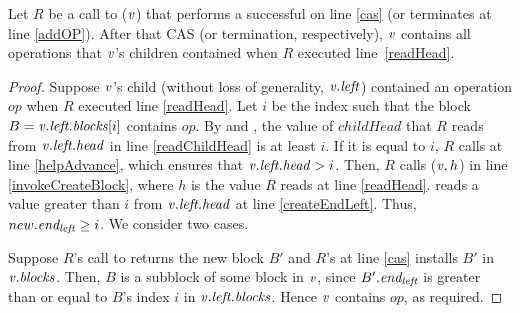\begin{lemma}\label{successfulRefresh}
Let $R$ be a call to ($\mbox{\textnormal{\textit{v}}}$) that performs a successful  on line \ref{cas} (or terminates at line \ref{addOP}).
After that CAS (or termination, respectively), $\mbox{\textnormal{\textit{v}}}$ contains all operations that $\mbox{\textnormal{\textit{v}}}$'s children contained 
when $R$ executed line~\ref{readHead}.
\end{lemma}
\begin{proof}
Suppose $\mbox{\textnormal{\textit{v}}}$'s child (without loss of generality, $\mbox{\textnormal{\textit{v}}}.\mbox{\textit{left}}$) contained an operation $op$ 
when $R$ executed line \ref{readHead}.
Let $i$ be the index such that the block $B=\mbox{\textnormal{\textit{v}}}.\mbox{\textit{left.blocks}}[i]$ contains $op$.
By  and , the value of $childHead$ that $R$ reads from
$\mbox{\textnormal{\textit{v}}}.\mbox{\textit{left.head}}$ in line \ref{readChildHead} is at least $i$.
If it is equal to $i$, $R$ calls  at line \ref{helpAdvance}, which ensures that 
$\mbox{\textnormal{\textit{v}}}.\mbox{\textit{left.head}} > i$.
Then, $R$ calls ($\mbox{\textnormal{\textit{v}}},h$) in line \ref{invokeCreateBlock}, where $h$ is the value $R$ reads at line \ref{readHead}.
 reads a value greater than $i$ from $\mbox{\textnormal{\textit{v}}}.\mbox{\textit{left.head}}$ at line \ref{createEndLeft}.
Thus, $new.\mbox{\textit{end\textsubscript{left}}} \geq i$.  We consider two cases.

Suppose $R$'s call to  returns the new block $B'$ and $R$'s  at line \ref{cas} 
installs $B'$ in $\mbox{\textnormal{\textit{v}}}.\mbox{\textit{blocks}}$.
Then, $B$ is a subblock of some block in $\mbox{\textnormal{\textit{v}}}$, since  $B'.\mbox{\textit{end\textsubscript{left}}}$ is greater than or equal to $B$'s index
$i$ in $\mbox{\textnormal{\textit{v}}}.\mbox{\textit{left.blocks}}$.
Hence $\mbox{\textnormal{\textit{v}}}$ contains $op$, as required.


\end{proof}
